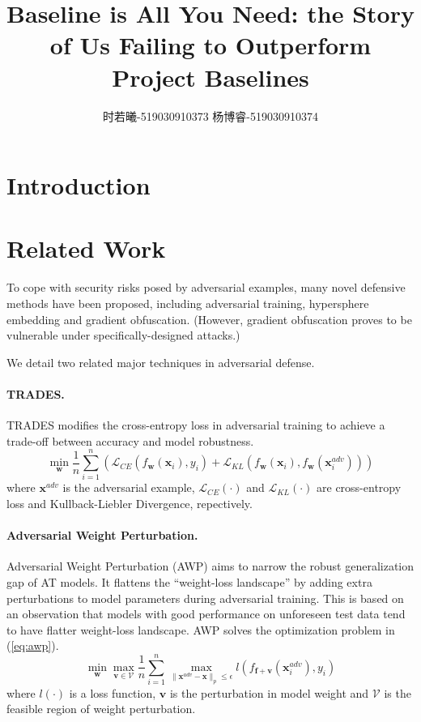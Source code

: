 \documentclass{article}
\title{Baseline is All You Need: the Story of Us Failing to Outperform Project Baselines}
\author{时若曦-519030910373 \quad 杨博睿-519030910374}
\date{}
\begin{document}
\maketitle
\section{Introduction}\label{sec:Intro}


\section{Related Work}\label{sec:RelatedWork}
    To cope with security risks posed by adversarial examples, many novel defensive methods have been proposed, including adversarial training, hypersphere embedding and gradient obfuscation. (However, gradient obfuscation proves to be vulnerable under specifically-designed attacks.)

    We detail two related major techniques in adversarial defense.
    \paragraph{TRADES.} TRADES modifies the cross-entropy loss in adversarial training to achieve a trade-off between accuracy and model robustness.
    \begin{equation}\label{eq:trades}
        \min_{\mathbf{w}} \frac{1}{n}\sum_{i=1}^n \left( \mathcal{L}_{CE}\left( f_{\mathbf{w}}(\mathbf{x}_i), y_i \right) + \mathcal{L}_{KL}\left(f_{\mathbf{w}}(\mathbf{x}_i), f_{\mathbf{w}}(\mathbf{x}_i^{adv})\right) \right)
    \end{equation}
    where $\mathbf{x}^{adv}$ is the adversarial example, $\mathcal{L}_{CE}(\cdot)$ and $\mathcal{L}_{KL}(\cdot)$ are cross-entropy loss and Kullback-Liebler Divergence, repectively.

    \paragraph{Adversarial Weight Perturbation.} Adversarial Weight Perturbation (AWP) aims to narrow the robust generalization gap of AT models. It flattens the ``weight-loss landscape'' by adding extra perturbations to model parameters during adversarial training. This is based on an observation that models with good performance on unforeseen test data tend to have flatter weight-loss landscape. AWP solves the optimization problem in (\ref{eq:awp}).
    \begin{equation}\label{eq:awp}
        \min_{\mathbf{w}} \max_{\mathbf{v} \in \mathcal{V}} \frac{1}{n}\sum_{i=1}^n \max_{\|\mathbf{x}^{adv} - \mathbf{x}\|_p \le \epsilon} l(f_{\mathbf{f}+\mathbf{v}}(\mathbf{x}^{adv}_i), y_i)
    \end{equation}
    where $l(\cdot)$ is a loss function, $\mathbf{v}$ is the perturbation in model weight and $\mathcal{V}$ is the feasible region of weight perturbation.
 
\end{document}
